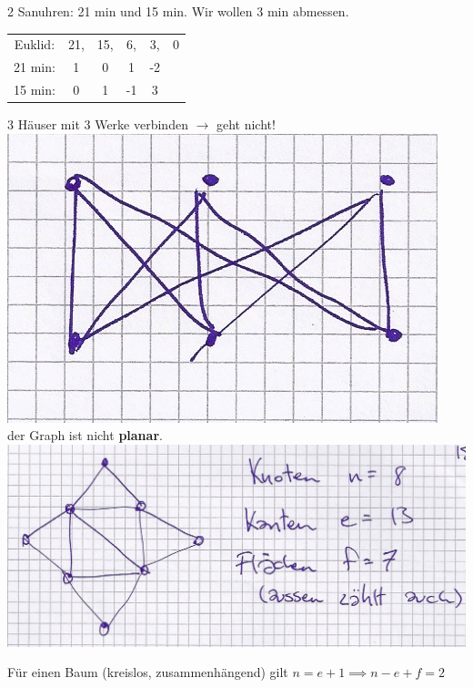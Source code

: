 \begin{bsp}
	2 Sanuhren: 21 min und 15 min. Wir wollen 3 min abmessen. \\
	\begin{tabular}{ c c c c c c }
		Euklid:	& 21,	& 15,	& 6,	& 3,	& 0 \\
		21 min:	& 1	&0	&1	&-2 \\
		15 min:	&0	&1	& -1	&3
	\end{tabular}
\end{bsp}

\begin{bsp}[note = Verbindungen ohne Überkreuzen]
	3 Häuser mit 3 Werke verbinden $\rightarrow$ geht nicht! \\
	\includegraphics{Bild2} \\
	der Graph ist nicht \textbf{planar}. \\
	\includegraphics[width=\textwidth]{Bild3}
	\begin{bew}[head = Beweisidee:]
		\quad Für einen Baum (kreislos, zusammenhängend) gilt $n = e +1 \implies n - e + f = 2$ \\

\end{bew}
\end{bsp}
